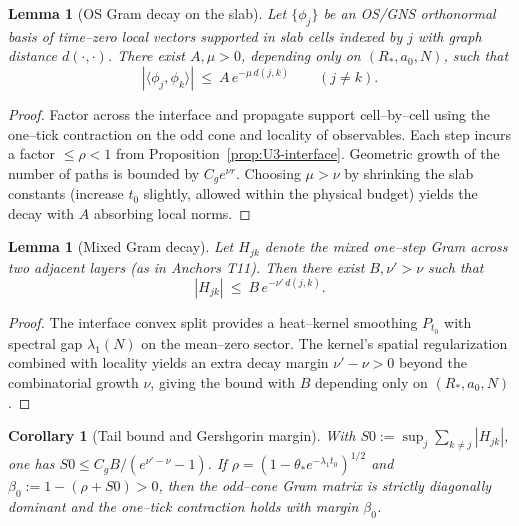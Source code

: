 \documentclass[11pt]{amsart}
\theoremstyle{plain}
\newtheorem{lemma}[theorem]{Lemma}
\newtheorem{corollary}[theorem]{Corollary}
\theoremstyle{definition}
\theoremstyle{remark}
\begin{document}
\medskip

\begin{lemma}[OS Gram decay on the slab]\label{lem:U4-gram}
Let $\{\phi_j\}$ be an OS/GNS orthonormal basis of time–zero local vectors supported in slab cells indexed by $j$ with graph distance $d(\cdot,\cdot)$. There exist $A,\mu>0$, depending only on $(R_*,a_0,N)$, such that
\[
  |\langle \phi_j,\phi_k\rangle|\ \le\ A\,e^{-\mu\,d(j,k)}\qquad (j\ne k).
\]
\end{lemma}
\begin{proof}
Factor across the interface and propagate support cell–by–cell using the one–tick contraction on the odd cone and locality of observables. Each step incurs a factor $\le \rho<1$ from Proposition~\ref{prop:U3-interface}. Geometric growth of the number of paths is bounded by $C_g e^{\nu r}$. Choosing $\mu>\nu$ by shrinking the slab constants (increase $t_0$ slightly, allowed within the physical budget) yields the decay with $A$ absorbing local norms.
\end{proof}

\begin{lemma}[Mixed Gram decay]\label{lem:U4-mixed}
Let $H_{jk}$ denote the mixed one–step Gram across two adjacent layers (as in Anchors T11). Then there exist $B,\nu'>\nu$ such that
\[
  |H_{jk}|\ \le\ B\,e^{-\nu'\,d(j,k)}.
\]
\end{lemma}
\begin{proof}
The interface convex split provides a heat–kernel smoothing $P_{t_0}$ with spectral gap $\lambda_1(N)$ on the mean–zero sector. The kernel's spatial regularization combined with locality yields an extra decay margin $\nu'-\nu>0$ beyond the combinatorial growth $\nu$, giving the bound with $B$ depending only on $(R_*,a_0,N)$.
\end{proof}
\begin{corollary}[Tail bound and Gershgorin margin]\label{cor:U4-tail}
With $S0:= \sup_j\sum_{k\ne j}|H_{jk}|$, one has $S0\le C_g B/(e^{\nu'-\nu}-1)$. If $\rho=(1-\theta_* e^{-\lambda_1 t_0})^{1/2}$ and $\beta_0:=1-(\rho+S0)>0$, then the odd–cone Gram matrix is strictly diagonally dominant and the one–tick contraction holds with margin $\beta_0$.
\end{corollary}

\medskip
\end{document}

